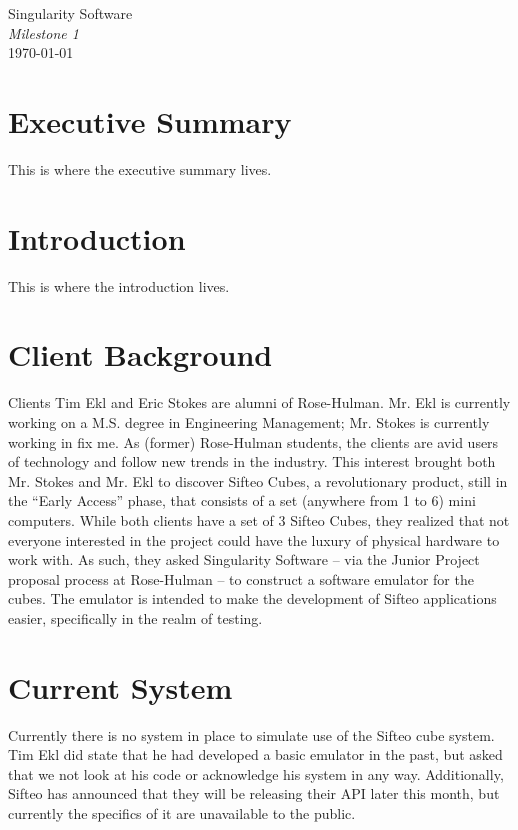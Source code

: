 \documentclass[12pt]{article}
\begin{document}
\vspace*{\fill}
        \begin{center}
                \LARGE{Singularity Software} \\
                \LARGE{\textit{Milestone 1}} \\
                \vspace{.15in}
                \large{\today} \\
        \end{center}
\vspace*{\fill}

\clearpage

\tableofcontents

\clearpage

\section{Executive Summary}
This is where the executive summary lives.

\section{Introduction}
This is where the introduction lives.

\section{Client Background}
Clients Tim Ekl and Eric Stokes are alumni of Rose-Hulman. Mr. Ekl is currently working on a M.S. degree in Engineering Management; Mr. Stokes is currently working in {fix me}. As (former) Rose-Hulman students, the clients are avid users of technology and follow new trends in the industry. This interest brought both Mr. Stokes and Mr. Ekl to discover Sifteo Cubes, a revolutionary product, still in the “Early Access” phase, that consists of a set (anywhere from 1 to 6) mini computers. While both clients have a set of 3 Sifteo Cubes, they realized that not everyone interested in the project could have the luxury of physical hardware to work with. As such, they asked Singularity Software – via the Junior Project proposal process at Rose-Hulman – to construct a software emulator for the cubes. The emulator is intended to make the development of Sifteo applications easier, specifically in the realm of testing.

\section{Current System}
Currently there is no system in place to simulate use of the Sifteo cube system. Tim Ekl did state that he had developed a basic emulator in the past, but asked that we not look at his code or acknowledge his system in any way. Additionally, Sifteo has announced that they will be releasing their API later this month, but currently the specifics of it are unavailable to the public.
\end{document}
